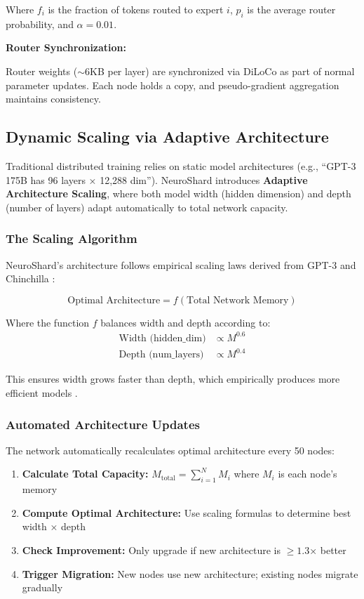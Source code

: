 \documentclass[11pt,a4paper]{article}
\begin{document}
Where $f_i$ is the fraction of tokens routed to expert $i$, $p_i$ is the average router probability, and $\alpha = 0.01$.

\textbf{Router Synchronization:}

Router weights ($\sim$6KB per layer) are synchronized via DiLoCo as part of normal parameter updates. Each node holds a copy, and pseudo-gradient aggregation maintains consistency.

\subsection{Dynamic Scaling via Adaptive Architecture}

Traditional distributed training relies on static model architectures (e.g., ``GPT-3 175B has 96 layers × 12,288 dim''). NeuroShard introduces \textbf{Adaptive Architecture Scaling}, where both model width (hidden dimension) and depth (number of layers) adapt automatically to total network capacity.

\subsubsection{The Scaling Algorithm}

NeuroShard's architecture follows empirical scaling laws derived from GPT-3 \cite{brown2020language} and Chinchilla \cite{hoffmann2022training}:

\begin{equation}
\text{Optimal Architecture} = f(\text{Total Network Memory})
\end{equation}

Where the function $f$ balances width and depth according to:
\begin{align}
\text{Width (hidden\_dim)} &\propto M^{0.6} \\
\text{Depth (num\_layers)} &\propto M^{0.4}
\end{align}

This ensures width grows faster than depth, which empirically produces more efficient models \cite{kaplan2020scaling}.

\subsubsection{Automated Architecture Updates}

The network automatically recalculates optimal architecture every 50 nodes:
\begin{enumerate}
    \item \textbf{Calculate Total Capacity:} $M_{\text{total}} = \sum_{i=1}^{N} M_i$ where $M_i$ is each node's memory
    \item \textbf{Compute Optimal Architecture:} Use scaling formulas to determine best width × depth
    \item \textbf{Check Improvement:} Only upgrade if new architecture is $\geq 1.3$× better
    \item \textbf{Trigger Migration:} New nodes use new architecture; existing nodes migrate gradually
\end{enumerate}
\end{document}
